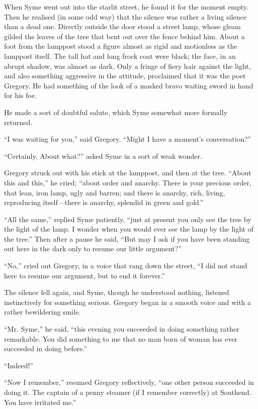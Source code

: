 When Syme went out into the starlit street, he found it for the moment empty. Then he realised (in some odd way) that the silence was rather a living silence than a dead one. Directly outside the door stood a street lamp, whose gleam gilded the leaves of the tree that bent out over the fence behind him. About a foot from the lamppost stood a figure almost as rigid and motionless as the lamppost itself. The tall hat and long frock coat were black; the face, in an abrupt shadow, was almost as dark. Only a fringe of fiery hair against the light, and also something aggressive in the attitude, proclaimed that it was the poet Gregory. He had something of the look of a masked bravo waiting sword in hand for his foe.

He made a sort of doubtful salute, which Syme somewhat more formally returned.

“I was waiting for you,” said Gregory. “Might I have a moment’s conversation?”

“Certainly. About what?” asked Syme in a sort of weak wonder.

Gregory struck out with his stick at the lamppost, and then at the tree. “About this and this,” he cried; “about order and anarchy. There is your precious order, that lean, iron lamp, ugly and barren; and there is anarchy, rich, living, reproducing itself⁠—there is anarchy, splendid in green and gold.”

“All the same,” replied Syme patiently, “just at present you only see the tree by the light of the lamp. I wonder when you would ever see the lamp by the light of the tree.” Then after a pause he said, “But may I ask if you have been standing out here in the dark only to resume our little argument?”

“No,” cried out Gregory, in a voice that rang down the street, “I did not stand here to resume our argument, but to end it forever.”

The silence fell again, and Syme, though he understood nothing, listened instinctively for something serious. Gregory began in a smooth voice and with a rather bewildering smile.

“Mr. Syme,” he said, “this evening you succeeded in doing something rather remarkable. You did something to me that no man born of woman has ever succeeded in doing before.”

“Indeed!”

“Now I remember,” resumed Gregory reflectively, “one other person succeeded in doing it. The captain of a penny steamer (if I remember correctly) at Southend. You have irritated me.”

